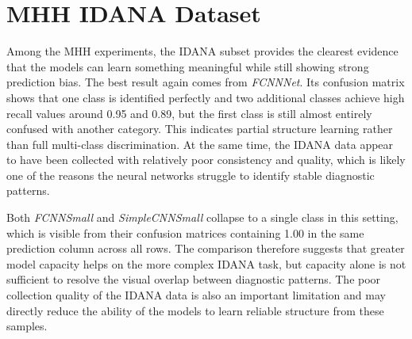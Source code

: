 \documentclass[12pt]{report}
\begin{document}
\clearpage
\section{MHH IDANA Dataset}

Among the MHH experiments, the IDANA subset provides the clearest evidence that the models can learn something meaningful while still showing strong prediction bias. The best result again comes from \textit{FCNNNet}. Its confusion matrix shows that one class is identified perfectly and two additional classes achieve high recall values around 0.95 and 0.89, but the first class is still almost entirely confused with another category. This indicates partial structure learning rather than full multi-class discrimination. At the same time, the IDANA data appear to have been collected with relatively poor consistency and quality, which is likely one of the reasons the neural networks struggle to identify stable diagnostic patterns.

Both \textit{FCNNSmall} and \textit{SimpleCNNSmall} collapse to a single class in this setting, which is visible from their confusion matrices containing 1.00 in the same prediction column across all rows. The comparison therefore suggests that greater model capacity helps on the more complex IDANA task, but capacity alone is not sufficient to resolve the visual overlap between diagnostic patterns. The poor collection quality of the IDANA data is also an important limitation and may directly reduce the ability of the models to learn reliable structure from these samples.
\end{document}

